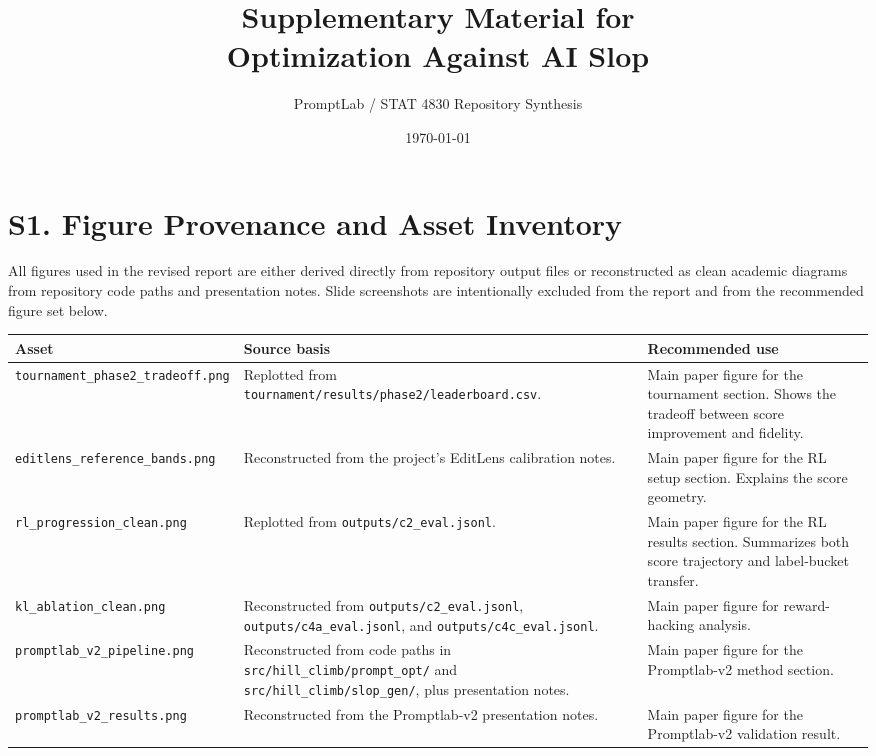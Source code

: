 \documentclass[11pt]{article}
\title{Supplementary Material for\\Optimization Against AI Slop}
\author{PromptLab / STAT 4830 Repository Synthesis}
\date{\today}
\begin{document}
\maketitle

\section*{S1. Figure Provenance and Asset Inventory}

All figures used in the revised report are either derived directly from repository output files or reconstructed as clean academic diagrams from repository code paths and presentation notes. Slide screenshots are intentionally excluded from the report and from the recommended figure set below.

\begin{table}[h]
\centering
\small
\begin{tabularx}{\linewidth}{l Y Y}
\toprule
Asset & Source basis & Recommended use \\
\midrule
\texttt{tournament\_phase2\_tradeoff.png} & Replotted from \texttt{tournament/results/phase2/leaderboard.csv}. & Main paper figure for the tournament section. Shows the tradeoff between score improvement and fidelity. \\
\texttt{editlens\_reference\_bands.png} & Reconstructed from the project's EditLens calibration notes. & Main paper figure for the RL setup section. Explains the score geometry. \\
\texttt{rl\_progression\_clean.png} & Replotted from \texttt{outputs/c2\_eval.jsonl}. & Main paper figure for the RL results section. Summarizes both score trajectory and label-bucket transfer. \\
\texttt{kl\_ablation\_clean.png} & Reconstructed from \texttt{outputs/c2\_eval.jsonl}, \texttt{outputs/c4a\_eval.jsonl}, and \texttt{outputs/c4c\_eval.jsonl}. & Main paper figure for reward-hacking analysis. \\
\texttt{promptlab\_v2\_pipeline.png} & Reconstructed from code paths in \texttt{src/hill\_climb/prompt\_opt/} and \texttt{src/hill\_climb/slop\_gen/}, plus presentation notes. & Main paper figure for the Promptlab-v2 method section. \\
\texttt{promptlab\_v2\_results.png} & Reconstructed from the Promptlab-v2 presentation notes. & Main paper figure for the Promptlab-v2 validation result. \\
\bottomrule
\end{tabularx}
\end{table}
\end{document}
